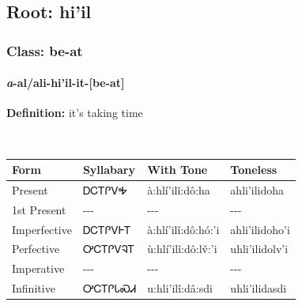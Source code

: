 \needspace{4in}
\subsection*{Root: hi'il}
\nopagebreak
{}
\needspace{3in}
\subsubsection*{Class: be-at}
\nopagebreak
\needspace{2in}
\paragraph*{\textit{a}{-}al/ali{-}\textbf{hi'il}{-}it{-}[be-at]}
\nopagebreak
\textbf{Definition: } it{\textquoteright}s taking time
\\[0.5em]
\begin{tabularx}{\textwidth}{l X X X}%
\toprule%
\textbf{Form}&\textbf{Syllabary}&\textbf{With Tone}&\textbf{Toneless}\\%
\midrule%
Present&ᎠᏟᎢᎵᏙᎭ&à:hlí’ilǐ:dô:ha&ahli’ilidoha\\%
1st Present&{-}{-}{-}&{-}{-}{-}&{-}{-}{-}\\%
Imperfective&ᎠᏟᎢᎵᏙᎰᎢ&à:hlí’ilǐ:dô:hó:’i&ahli’ilidoho’i\\%
Perfective&ᎤᏟᎢᎵᏙᎸᎢ&ù:hlí’ilǐ:dô:lv̌:’i&uhli’ilidolv’i\\%
Imperative&{-}{-}{-}&{-}{-}{-}&{-}{-}{-}\\%
Infinitive&ᎤᏟᎢᎵᏓᏍᏗ&u:hli’ilǐ:dâ:sdi&uhli’ilidasdi\\%
\bottomrule%
\end{tabularx}
\\[1em]